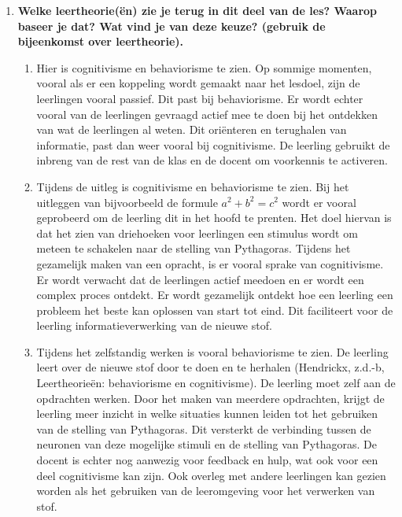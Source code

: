 \documentclass{article}
\begin{document}
\begin{enumerate}[label=(\alph*)]
\begin{enumerate}[label=\arabic*.]
                    \end{enumerate}
                \item \textbf{Welke leertheorie(ën) zie je terug in dit deel van de les? Waarop baseer je dat? Wat vind je van deze keuze? (gebruik de bijeenkomst over leertheorie).} \\
                    \begin{enumerate}[label=\arabic*.]
                        \item Hier is cognitivisme en behaviorisme te zien. Op sommige momenten, vooral als er een koppeling wordt gemaakt naar het lesdoel, zijn de leerlingen vooral passief. Dit past bij behaviorisme. Er wordt echter vooral van de leerlingen gevraagd actief mee te doen bij het ontdekken van wat de leerlingen al weten. Dit oriënteren en terughalen van informatie, past dan weer vooral bij cognitivisme. De leerling gebruikt de inbreng van de rest van de klas en de docent om voorkennis te activeren.\\
                        \item Tijdens de uitleg is cognitivisme en behaviorisme te zien. Bij het uitleggen van bijvoorbeeld de formule $a^2 + b^2 = c^2$ wordt er vooral geprobeerd om de leerling dit in het hoofd te prenten. Het doel hiervan is dat het zien van driehoeken voor leerlingen een stimulus wordt om meteen te schakelen naar de stelling van Pythagoras. Tijdens het gezamelijk maken van een opracht, is er vooral sprake van cognitivisme. Er wordt verwacht dat de leerlingen actief meedoen en er wordt een complex proces ontdekt. Er wordt gezamelijk ontdekt hoe een leerling een probleem het beste kan oplossen van start tot eind. Dit faciliteert voor de leerling informatieverwerking van de nieuwe stof.\\
                        \item Tijdens het zelfstandig werken is vooral behaviorisme te zien. De leerling leert over de nieuwe stof door te doen en te herhalen (Hendrickx, z.d.-b, Leertheorieën: behaviorisme en cognitivisme). De leerling moet zelf aan de opdrachten werken. Door het maken van meerdere opdrachten, krijgt de leerling meer inzicht in welke situaties kunnen leiden tot het gebruiken van de stelling van Pythagoras. Dit versterkt de verbinding tussen de neuronen van deze mogelijke stimuli en de stelling van Pythagoras. De docent is echter nog aanwezig voor feedback en hulp, wat ook voor een deel cognitivisme kan zijn. Ook overleg met andere leerlingen kan gezien worden als het gebruiken van de leeromgeving voor het verwerken van stof. 
                    \end{enumerate}
            \end{enumerate}
\end{document}
